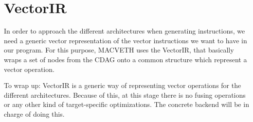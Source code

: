 \documentclass[a4paper,12pt]{memoir}
\begin{document}
\section{VectorIR}
In order to approach the different architectures when generating instructions,
we need a generic vector representation of the vector instructions we want to
have in our program. For this purpose, MACVETH uses the VectorIR, that basically
wraps a set of nodes from the CDAG onto a common structure which represent a vector operation.

To wrap up: VectorIR is a generic way of representing vector operations for the different
architectures. Because of this, at this stage there is no fusing operations or
any other kind of target-specific optimizations. The concrete backend will be in
charge of doing this.





\end{document}
